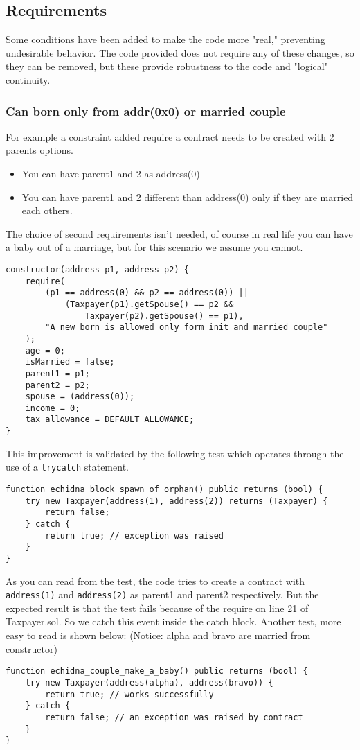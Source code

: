 \documentclass{article}
\begin{document}
\subsection{Requirements}
Some conditions have been added to make the code more "real," preventing undesirable behavior. The code provided does not require any of these changes, so they can be removed, but these provide robustness to the code and "logical" continuity.
\subsubsection{Can born only from addr(0x0) or married couple}
For example a constraint added require a contract needs to be created with 2 parents options.
\begin{itemize}
    \small
    \item You can have parent1 and 2 as address(0)
    \item You can have parent1 and 2 different than address(0) only if they are married each others.
\end{itemize}
The choice of second requirements isn't needed, of course in real life you can have a baby out of a marriage, but for this scenario we assume you cannot.
\begin{verbatim}
constructor(address p1, address p2) {
    require(
        (p1 == address(0) && p2 == address(0)) ||
            (Taxpayer(p1).getSpouse() == p2 &&
                Taxpayer(p2).getSpouse() == p1),
        "A new born is allowed only form init and married couple"
    );
    age = 0;
    isMarried = false;
    parent1 = p1;
    parent2 = p2;
    spouse = (address(0));
    income = 0;
    tax_allowance = DEFAULT_ALLOWANCE;
}
\end{verbatim}
This improvement is validated by the following test which operates through the use of a \texttt{try{}catch{}} statement.
\begin{verbatim}
function echidna_block_spawn_of_orphan() public returns (bool) {
    try new Taxpayer(address(1), address(2)) returns (Taxpayer) {
        return false;
    } catch {
        return true; // exception was raised
    }
}
\end{verbatim}
As you can read from the test, the code tries to create a contract with \texttt{address(1)} and \texttt{address(2)} as parent1 and parent2 respectively. But the expected result is that the test fails because of the require on line 21 of Taxpayer.sol. So we catch this event inside the catch{} block.
Another test, more easy to read is shown below: (Notice: alpha and bravo are married from constructor)
\begin{verbatim}
function echidna_couple_make_a_baby() public returns (bool) {
    try new Taxpayer(address(alpha), address(bravo)) {
        return true; // works successfully
    } catch {
        return false; // an exception was raised by contract
    }
}
\end{verbatim}
\end{document}
